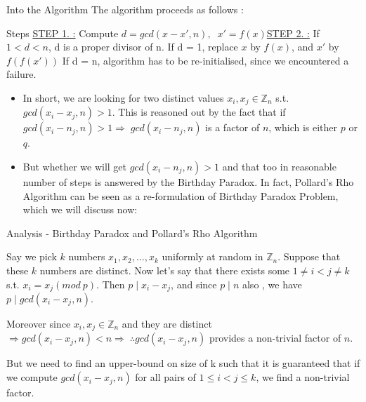 \documentclass{beamer}
\begin{document}
\begin{frame}{Into the Algorithm}
The algorithm proceeds as follows :
\begin{block}{Steps}
\underline{STEP 1. :} Compute $d = gcd\left( x-x',n\right) ,\;\; x'=f\left( x\right) $\break\underline{STEP 2. :} If $1 < d < n$, d is a proper divisor of n. \break If d = 1, replace $x$ by $f\left( x\right)$, and $x'$ by $f\left(f\left( x'\right)\right)$ \break If d = n, algorithm has to be re-initialised, since we encountered a failure.
\end{block}
\begin{itemize}
    \item In short, we are looking for two distinct values $x_{i},x_{j}\in \mathbb{Z} _{n}$ s.t. $gcd\left( x_{i}-x_{j},n\right)  >1$. This is reasoned out by the fact that if $gcd\left( x_{i}-n_{j},n\right)  >1 \Rightarrow \; gcd\left( x_{i}-n_{j},n\right)$ is a factor of $n$, which is either $p$ or $q$.
    \item But whether we will get $gcd\left( x_{i}-n_{j},n\right)  >1$ and that too in reasonable number of steps is answered by the Birthday Paradox. In fact, Pollard's Rho Algorithm can be seen as a re-formulation of Birthday Paradox Problem, which we will discuss now:
\end{itemize}
\end{frame}


\begin{frame}{Analysis - Birthday Paradox and Pollard's Rho Algorithm}
    \begin{block}{}
        Say we pick $k$ numbers $x_{1},x_{2},\ldots ,x_{k}$ uniformly at random in  $\mathbb{Z} _{n}$. Suppose that these $k$ numbers are distinct. Now let's say that there exists some $1\neq i < j \neq k$ s.t. $x_{i}=x_{j}\left( mod\:p\right) $. Then $p\;|\;x_{i}-x_{j}$, and since $p\;|\;n$ also , we have $p\;|\;gcd\left( x_{i}-x_{j},n\right)$.
    \end{block}
    \begin{block}{}
         Moreover since $x_{i}, x_{j} \in \mathbb{Z}_{n}$ and they are distinct $\Rightarrow gcd\left( x_{i}-x_{j},n\right) < n \Rightarrow \; \therefore gcd\left( x_{i}-x_{j},n\right)$ provides a non-trivial factor of $n$.
    \end{block}
    \begin{block}{}
        But we need to find an upper-bound on size of k such that it is guaranteed that if we compute $gcd\left( x_{i}-x_{j},n\right)$ for all pairs of $1 \leq i < j \leq k$, we find a non-trivial factor.
    \end{block}
\end{frame}
\end{document}
